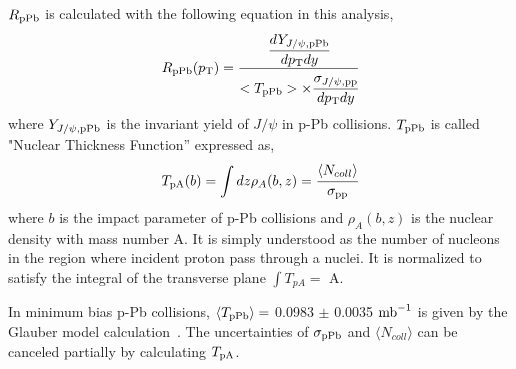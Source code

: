 $R_{\rm{pPb}}$ is calculated with the following equation in this analysis, 
\begin{equation}
\label{eq_4_rppb}
  R_{\rm{pPb}} (p_{\rm{T}}) = \cfrac{ \cfrac{ dY_{J/\psi , \rm{pPb}} }{ dp_{\rm{T}}dy } }{<T_{\rm{pPb}}>\times \cfrac{\sigma_{J/\psi, \rm{pp}}}{dp_{\rm{T}}dy}}
\end{equation}
where $Y_{J/\psi ,\rm{ pPb}}$ is the invariant yield of $J/\psi$ in p-Pb collisions. 
$T_{\rm{pPb}}$ is called "Nuclear Thickness Function'' expressed as, 
\begin{equation}
  T_{\rm{p}A}(b) = \int{dz \rho_{A}(b,z)} = \cfrac{\langle N_{coll}\rangle }{\sigma_{\rm{pp}}}
\end{equation}
 where $b$ is the impact parameter of p-Pb collisions and $\rho_{A}(b, z)$ is the nuclear density with mass number A.  
It is simply understood as the number of nucleons in the region where incident proton pass through a nuclei. 
It is normalized to satisfy the integral of the transverse plane $\int{T_{pA}} =$ A.

In minimum bias p-Pb collisions, $\langle T_{\rm{pPb}}\rangle =$ 0.0983 $\pm$ 0.0035 $\rm{mb}^{-1}$ is given by the Glauber model calculation~\cite{bib_tppb}.
The uncertainties of $\sigma_{\rm{pPb}}$ and $\langle N_{coll}\rangle$ can be canceled partially by calculating ${T_{\rm{p}A}}$.

